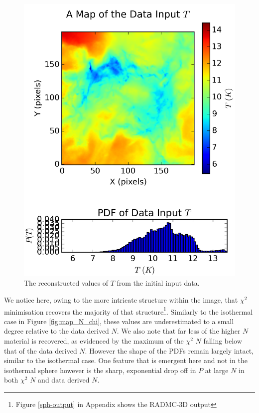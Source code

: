 \documentclass{report}
\begin{document}
\begin{figure}[H]
\begin{minipage}[b]{0.25\linewidth}
    \includegraphics[width=\linewidth]{../img/sph/map_T_data.png}
    \caption{\protect The reconstructed values of $T$ from the initial input data.}\label{fig:map_T_data_sph}
    \vspace{4ex}
  \end{minipage}
\end{figure}

We notice here, owing to the more intricate structure within the image, that $\chi^{2}$ minimisation recovers the majority of that structure\footnote{Figure \ref{sph-output} in Appendix shows the RADMC-3D output}. Similarly to the isothermal case in Figure \ref{fig:map_N_chi}, these values are underestimated to a small degree relative to the data derived $N$. We also note that far less of the higher $N$ material is recovered, as evidenced by the maximum of the $\chi^{2}$ $N$ falling below that of the data derived $N$. However the shape of the PDFs remain largely intact, similar to the isothermal case. One feature that is emergent here and not in the isothermal sphere however is the sharp, exponential drop off in $P$ at large $N$ in both $\chi^{2}$ $N$ and data derived $N$.
\end{document}
